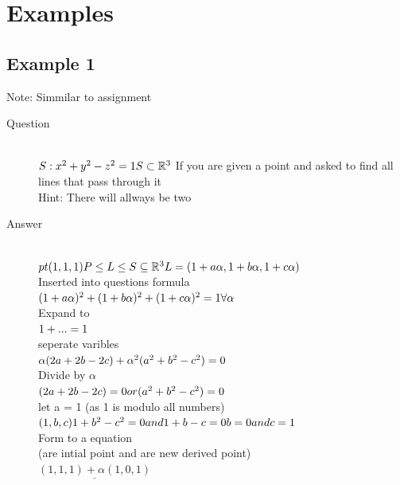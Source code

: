 \documentclass[11pt,twoside,a4paper]{article}
\begin{document}
  \clearpage
  \section{Examples}
  
    \subsection{Example 1}
      \label{Example 1}
      Note: Simmilar to assignment
      \begin{description}
        \item[Question] \hfill \\
          \(
            S:x^2+y^2-z^2=1 \\
            S\subset\mathbb{R}^3 \\
          \)
          If you are given a point and asked to find all lines that pass through it\\
          Hint: There will allways be two
        
        \item[Answer] \hfill \\
          \(
            pt(1,1,1) \\*
            P \leq L \leq S \subseteq \mathbb{R}^3 \\
            L = (1+a\alpha, 1+b\alpha, 1+c\alpha) \\
          \)
            \\ Inserted into questions formula \\
          \(
            (1+a\alpha)^2 + (1+b\alpha)^2 + (1+c\alpha)^2 = 1  \forall \alpha \\
          \)
            \\ Expand to\\
          \(
            1+ ... = 1 \\
          \)
            \\ seperate varibles \\
          \(
            \alpha(2a+2b-2c)+\alpha^2(a^2+b^2-c^2) = 0 \\
          \)
            \\ Divide by \(\alpha\) \\
          \(
            (2a+2b-2c) = 0 or (a^2+b^2-c^2) = 0 \\
          \)
            \\ let a = 1 (as 1 is modulo all numbers) \\
          \(
            (1,b,c) \\
            1+b^2-c^2 = 0 and 1+b-c=0 \\
            b=0 and c=1 \\
          \)
            \\ Form to a equation \\ (are intial point and are new derived point) \\
          \(
            \underline{(1,1,1) + \alpha(1,0,1)}
          \)
      \end{description}
  
  \clearpage
  
  
\end{document}
